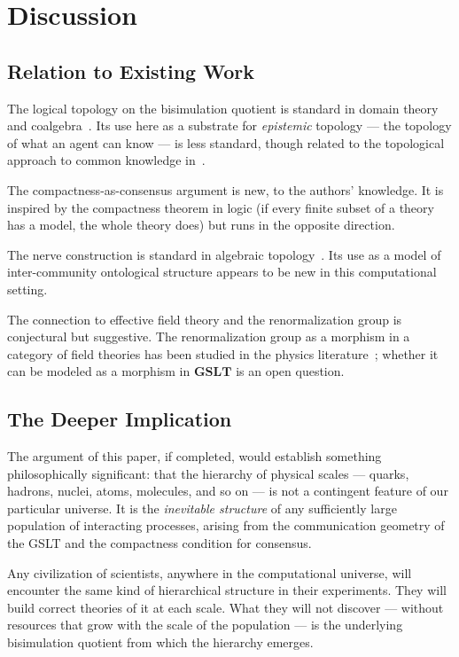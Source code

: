\chapter{Discussion}

\section{Relation to Existing Work}

The logical topology on the bisimulation quotient is standard in
domain theory and coalgebra~\cite{abramsky1991domain}.
Its use here as a substrate for \emph{epistemic} topology ---
the topology of what an agent can know --- is less standard,
though related to the topological approach to common knowledge
in~\cite{fagin1995reasoning}.

The compactness-as-consensus argument is new, to the authors'
knowledge.
It is inspired by the compactness theorem in logic (if every finite
subset of a theory has a model, the whole theory does) but runs in
the opposite direction.

The nerve construction is standard in algebraic
topology~\cite{hatcher2002algebraic}.
Its use as a model of inter-community ontological structure appears
to be new in this computational setting.

The connection to effective field theory and the renormalization group
is conjectural but suggestive.
The renormalization group as a morphism in a category of field
theories has been studied in the physics
literature~\cite{wilson1974renormalization};
whether it can be modeled as a morphism in $\mathbf{GSLT}$ is
an open question.

\section{The Deeper Implication}

The argument of this paper, if completed, would establish something
philosophically significant: that the hierarchy of physical scales ---
quarks, hadrons, nuclei, atoms, molecules, and so on --- is not a
contingent feature of our particular universe.
It is the \emph{inevitable structure} of any sufficiently large
population of interacting processes, arising from the communication
geometry of the GSLT and the compactness condition for consensus.

Any civilization of scientists, anywhere in the computational
universe, will encounter the same kind of hierarchical structure
in their experiments.
They will build correct theories of it at each scale.
What they will not discover --- without resources that grow with
the scale of the population --- is the underlying bisimulation
quotient from which the hierarchy emerges.

